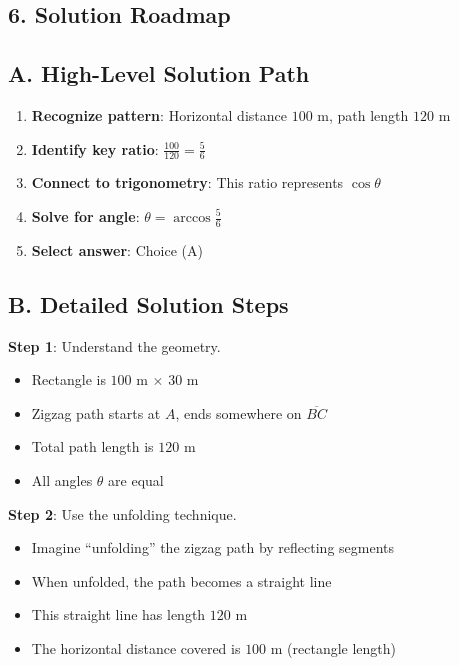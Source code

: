 \documentclass[11pt]{article}
\begin{document}
\begin{roadmapbox}
\section*{6. Solution Roadmap}

\subsection*{A. High-Level Solution Path}
\begin{enumerate}[leftmargin=*]
    \item \textbf{Recognize pattern}: Horizontal distance $100$ m, path length $120$ m
    \item \textbf{Identify key ratio}: $\frac{100}{120} = \frac{5}{6}$
    \item \textbf{Connect to trigonometry}: This ratio represents $\cos\theta$
    \item \textbf{Solve for angle}: $\theta = \arccos\frac{5}{6}$
    \item \textbf{Select answer}: Choice (A)
\end{enumerate}

\subsection*{B. Detailed Solution Steps}

\textbf{Step 1}: Understand the geometry.
\begin{itemize}
    \item Rectangle is $100$ m $\times$ $30$ m
    \item Zigzag path starts at $A$, ends somewhere on $\overline{BC}$
    \item Total path length is $120$ m
    \item All angles $\theta$ are equal
\end{itemize}

\textbf{Step 2}: Use the unfolding technique.
\begin{itemize}
    \item Imagine ``unfolding'' the zigzag path by reflecting segments
    \item When unfolded, the path becomes a straight line
    \item This straight line has length $120$ m
    \item The horizontal distance covered is $100$ m (rectangle length)
\end{itemize}


\end{roadmapbox}
\end{document}
